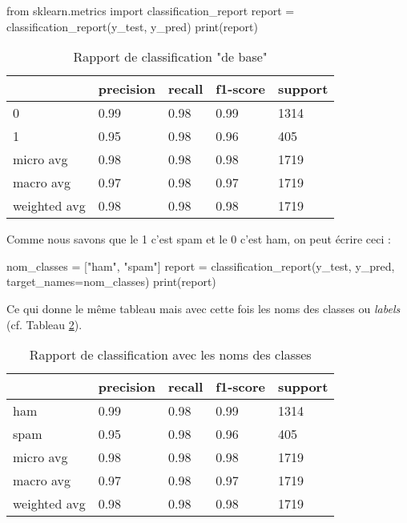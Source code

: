 \begin{python}
from sklearn.metrics import classification_report
report = classification_report(y_test, y_pred)
print(report)
\end{python}

\begin{table}[h]
\begin{center}
\begin{tabular}{lllll}
\hline
 &   precision& recall & f1-score &  support\\
\hline

    0&    0.99&   0.98&   0.99&   1314\\
    1&    0.95&   0.98&   0.96&    405\\
\hline

   micro avg&    0.98&   0.98&   0.98&   1719\\
   macro avg&    0.97&   0.98&   0.97&   1719\\
weighted avg&    0.98&   0.98&   0.98&   1719\\
\hline
\end{tabular}
\caption{Rapport de classification "de base"\label{class_report1}}
\end{center}
\end{table}

Comme nous savons que le 1 c'est spam et le 0 c'est ham, on peut écrire ceci :

\begin{python}
nom_classes = ["ham", "spam"]
report = classification_report(y_test, y_pred, target_names=nom_classes)
print(report)
\end{python}

Ce qui donne le même tableau mais avec cette fois les noms des classes ou \textit{labels} (cf. Tableau \ref{class_report2}). 


\begin{table}
\begin{center}
\begin{tabular}{lllll}

\hline
 &   precision& recall&  f1-score&   support\\
\hline

  ham&    0.99&   0.98&   0.99&   1314\\
 spam&    0.95&   0.98&   0.96&    405\\
\hline

   micro avg&    0.98&   0.98&   0.98&   1719\\
   macro avg&    0.97&   0.98&   0.97&   1719\\
weighted avg&    0.98&   0.98&   0.98&   1719\\

\end{tabular}
\caption{Rapport de classification avec les noms des classes\label{class_report2}}
\end{center}
\end{table}

